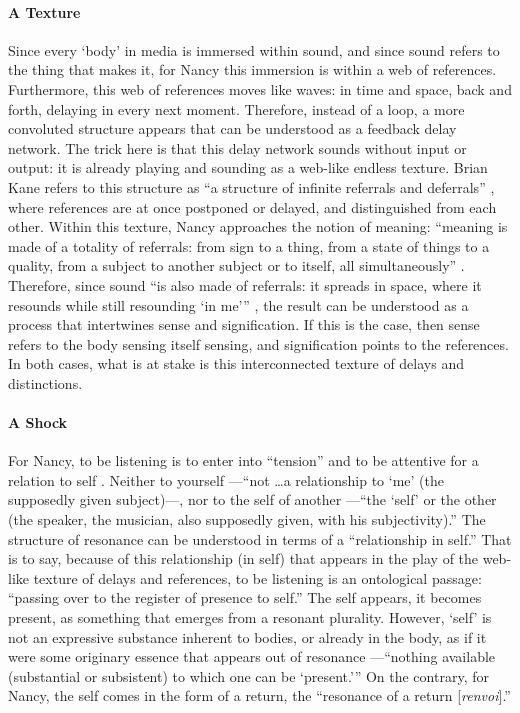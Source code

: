 \paragraph{A Texture}
Since every `body' in media is immersed within sound, and since sound refers to the thing that makes it, for Nancy this immersion is within a web of references. Furthermore, this web of references moves like waves: in time and space, back and forth, delaying in every next moment. Therefore, instead of a loop, a more convoluted structure appears that can be understood as a feedback delay network. The trick here is that this delay network sounds without input or output: it is already playing and sounding as a web-like endless texture. Brian Kane refers to this structure as ``a structure of infinite referrals and deferrals'' \parencite[143]{Gra15:The}, where references are at once postponed or delayed, and distinguished from each other. Within this texture, Nancy approaches the notion of meaning: ``meaning is made of a totality of referrals: from sign to a thing, from a state of things to a quality, from a subject to another subject or to itself, all simultaneously'' \parencite[4-9]{Nan07:Lis}. Therefore, since sound  ``is also made of referrals: it spreads in space, where it resounds while still resounding `in me''' \parencite[4-9]{Nan07:Lis}, the result can be understood as a process that intertwines sense and signification. If this is the case, then sense refers to the body sensing itself sensing, and signification points to the references. In both cases, what is at stake is this interconnected texture of delays and distinctions. 

\paragraph{A Shock}
For Nancy, to be listening is to enter into ``tension'' and to be attentive for a relation to self \parencite[12][All subsecuent quotes from this passage.]{Nan07:Lis}. Neither to yourself ---``not \dots a relationship to `me' (the supposedly given subject)---, nor to the self of another ---``the `self' or the other (the speaker, the musician, also supposedly given, with his subjectivity).'' The structure of resonance can be understood in terms of a ``relationship in self.'' That is to say, because of this relationship (in self) that appears in the play of the web-like texture of delays and references, to be listening is an ontological passage: ``passing over to the register of presence to self.'' The self appears, it becomes present, as something that emerges from a resonant plurality. However, `self' is not an expressive substance inherent to bodies, or already in the body, as if it were some originary essence that appears out of resonance ---``nothing available (substantial or subsistent) to which one can be `present.''' On the contrary, for Nancy, the self comes in the form of a return, the ``resonance of a return [\textit{renvoi}].''
